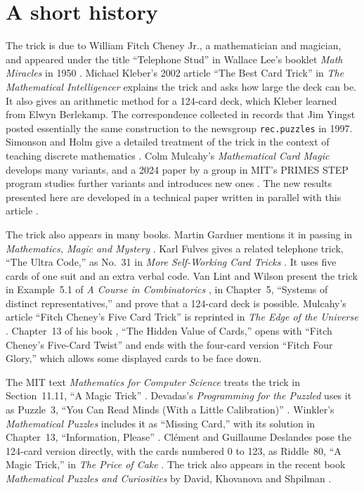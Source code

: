 \documentclass[11pt]{article}
\begin{document}
\section{A short history}

The trick is due to William Fitch Cheney Jr., a mathematician and magician,
and appeared under the title ``Telephone Stud'' in Wallace Lee's booklet
\emph{Math Miracles} in 1950 \cite{Lee}.
Michael Kleber's 2002 article ``The Best Card Trick'' in \emph{The Mathematical Intelligencer} \cite{Kleber} explains the trick and asks how large the deck can be. It also gives an arithmetic method for a 124-card deck, which Kleber learned from Elwyn Berlekamp.
The correspondence collected in \cite{MathPuzzle}
records that Jim Yingst posted essentially the same construction to the
newsgroup \texttt{rec.puzzles} in 1997.
Simonson and Holm give a detailed treatment of the trick
in the context of teaching discrete mathematics \cite{SimonsonHolm}. Colm Mulcahy's
\emph{Mathematical Card Magic} \cite{Mulcahy} develops many variants,
and a 2024 paper by a group in MIT's PRIMES STEP program studies further
variants and introduces new ones \cite{PRIMES}. The new results
presented here are developed in a technical paper written in parallel
with this article \cite{Symmetry}.

The trick also appears in many books. Martin Gardner mentions it in
passing in \emph{Mathematics, Magic and Mystery}
\cite[p.~32]{Gardner}.
Karl Fulves gives a related telephone trick, ``The Ultra Code,'' as No.~31 in \emph{More Self-Working Card Tricks} \cite[pp.~41--43]{Fulves}. It uses five cards of one suit and an extra verbal code.
Van Lint and Wilson present the trick in Example~5.1 of \emph{A Course in Combinatorics} \cite[pp.~44--45]{vanLintWilson}, in Chapter~5, ``Systems of distinct representatives,'' and prove that a 124-card deck is possible.
Mulcahy's article ``Fitch Cheney's Five Card Trick'' is reprinted in
\emph{The Edge of the Universe} \cite[pp.~273--276]{MulcahyEdge}.
Chapter~13 of his book \cite{Mulcahy}, ``The Hidden Value of Cards,''
opens with ``Fitch Cheney's Five-Card Twist'' and ends with the
four-card version ``Fitch Four Glory,'' which allows some displayed
cards to be face down.

The MIT text \emph{Mathematics for Computer Science} treats the trick
in Section~11.11, ``A Magic Trick'' \cite[pp.~346--353]{MCS}.
Devadas's \emph{Programming for the Puzzled} uses it as Puzzle~3,
``You Can Read Minds (With a Little Calibration)'' \cite{Devadas}.
Winkler's \emph{Mathematical Puzzles} includes it as ``Missing Card,''
with its solution in Chapter~13, ``Information, Please''
\cite[pp.~167--169]{Winkler}. Cl\'ement and Guillaume Deslandes pose
the 124-card version directly, with the cards numbered 0 to 123,
as Riddle~80, ``A Magic Trick,'' in \emph{The Price of Cake}
\cite{Deslandes}. The trick also appears in the recent book \emph{Mathematical Puzzles and Curiosities} by David, Khovanova and Shpilman \cite{DKS26}.
\end{document}
